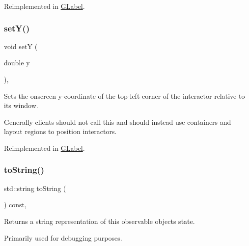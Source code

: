 Reimplemented in \mbox{\hyperlink{classGLabel_a173837ba805eaa2411e88834869d3a9c}{G\+Label}}.

\mbox{\label{classGInteractor_a7d57e2a5c35d27feb58fd498a3cf82b9}} 
\subsubsection{\texorpdfstring{set\+Y()}{setY()}}
{\footnotesize\ttfamily void setY (\begin{DoxyParamCaption}\item[{double}]{y }\end{DoxyParamCaption})\hspace{0.3cm}{\ttfamily [virtual]}, {\ttfamily [inherited]}}



Sets the onscreen y-\/coordinate of the top-\/left corner of the interactor relative to its window. 

Generally clients should not call this and should instead use containers and layout regions to position interactors. 

Reimplemented in \mbox{\hyperlink{classGLabel_a0b738606c7aca5c472b66c4e55b3c685}{G\+Label}}.

\mbox{\label{classGObservable_a1fe5121d6528fdea3f243321b3fa3a49}} 
\subsubsection{\texorpdfstring{to\+String()}{toString()}}
{\footnotesize\ttfamily std\+::string to\+String (\begin{DoxyParamCaption}{ }\end{DoxyParamCaption}) const\hspace{0.3cm}{\ttfamily [virtual]}, {\ttfamily [inherited]}}



Returns a string representation of this observable object\textquotesingle{}s state. 

Primarily used for debugging purposes. 